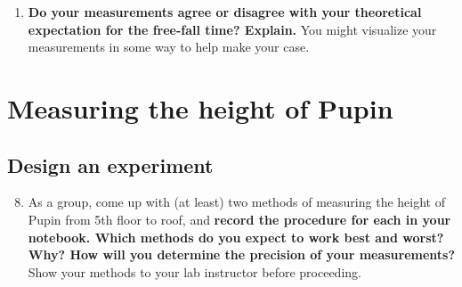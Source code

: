 \documentclass[12pt]{article}%
\begin{document}
\begin{enumerate}
\item \textbf{Do your measurements agree or disagree with your theoretical expectation for the free-fall time? Explain.} You might visualize your measurements in some way to help make your case.




\end{enumerate}

\section{Measuring the height of Pupin}


\subsection*{Design an experiment}

\begin{enumerate}
\setcounter{enumi}{7}
    \item As a group, come up with (at least) two methods of measuring the height of Pupin from 5th floor to roof, and \textbf{record the procedure for each in your notebook. Which methods do you expect to work best and worst? Why? How will you determine the precision of your measurements?} Show your methods to your lab instructor before proceeding. 
\end{enumerate}
\end{document}
